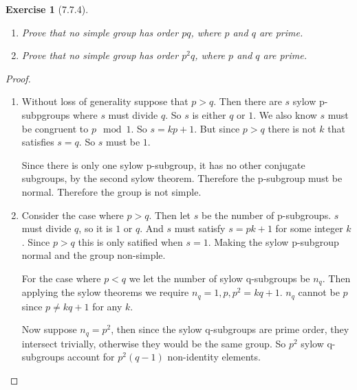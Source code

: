\documentclass[12pt]{article}
\newtheorem*{exer}{Exercise}
\begin{document}
\begin{exer}[7.7.4]

    \begin{enumerate}
        \item Prove that no simple group has order $pq$, where $p$ and
            $q$ are prime.

        \item Prove that no simple group has order $p^2q$, where $p$ and
            $q$ are prime.

    \end{enumerate}

\end{exer}

\begin{proof}

    \begin{enumerate}
        \item Without loss of generality suppose that $p > q$. Then
            there are $s$ sylow p-subpgroups where $s$ must divide $q$.
            So $s$ is either $q$ or $1$. We also know $s$ must be
            congruent to $p \mod 1$. So $s = kp + 1$. But since $p > q$
            there is not $k$ that satisfies $s = q$. So $s$ must be $1$. 

            Since there is only one sylow p-subgroup, it has no other
            conjugate subgroups, by the second sylow theorem. Therefore
            the p-subgroup must be normal. Therefore the group is not
            simple.

        \item Consider the case where $p > q$. Then let $s$ be the
            number of p-subgroups. $s$ must divide $q$, so it is $1$ or
            $q$. And $s$ must satisfy $s =
            pk + 1$ for some integer $k$. Since $p > q$ this is only
            satified when $s = 1$. Making the sylow p-subgroup normal
            and the group non-simple.

            For the case where $p < q$ we let the number of sylow
            q-subgroups be $n_q$. Then applying the sylow theorems we
            require $n_q = 1, p, p^2 = kq + 1$. $n_q$ cannot be $p$
            since $p \neq kq + 1$ for any $k$. 

            Now suppose $n_q = p^2$, then since the sylow q-subgroups
            are prime order, they intersect trivially, otherwise they
            would be the same group. So $p^2$ sylow q-subgroups account
            for $p^2(q - 1)$ non-identity elements. 


\end{enumerate}
\end{proof}
\end{document}
